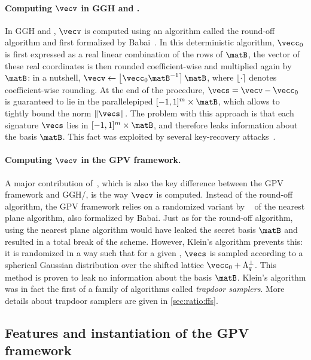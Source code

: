 \paragraph{Computing $\vecv$ in GGH and \ntrusign.}
 In GGH and \ntrusign, $\vecv$ is computed using an algorithm called the round-off algorithm and first formalized by Babai~\cite{STACS:Babai85,Combinatorica:Babai86}. In this deterministic algorithm, $\vecc_0$ is first expressed as a real linear combination of the rows of $\matB$, the vector of these real coordinates is then rounded coefficient-wise and multiplied again by $\matB$: in a nutshell, $\vecv \gets \left\lfloor \vecc_0 \matB^{-1} \right\rceil \matB$, where $\lfloor\cdot\rceil$ denotes coefficient-wise rounding. At the end of the procedure, $\vecs = \vecv- \vecc_0$ is guaranteed to lie in the parallelepiped $[-1, 1]^m \times \matB$, which allows to tightly bound the norm $\|\vecs\|$.
%
 The problem with this approach is that each signature $\vecs$ lies in $[-1, 1]^m \times \matB$, and therefore leaks information about the basis $\matB$. This fact was exploited by several key-recovery attacks~\cite{EC:NguReg06,AC:DucNgu12b}.
 
\paragraph{Computing $\vecv$ in the GPV framework.}
 A major contribution of~\cite{STOC:GenPeiVai08}, which is also the key difference between the GPV framework and GGH/\ntrusign, is the way $\vecv$ is computed. Instead of the round-off algorithm, the GPV framework relies on a randomized variant by  ~\cite{SODA:Klein00} of the nearest plane algorithm, also formalized by Babai.
 Just as for the round-off algorithm, using the nearest plane algorithm would have leaked the secret basis $\matB$ and resulted in a total break of the scheme. However, Klein's algorithm prevents this: it is randomized in a way such that for a given \msg, $\vecs$ is sampled according to a spherical Gaussian distribution over the shifted lattice $\vecc_0 + \Lambda_q^\perp$. This method is proven to leak no information about the basis $\matB$. Klein's algorithm was in fact the first of a family of algorithms called \textit{trapdoor samplers}. More details about trapdoor samplers are given in \cref{sec:ratio:ffs}.
 
\subsection{Features and instantiation of the GPV framework}\label{sec:ratio:features}

